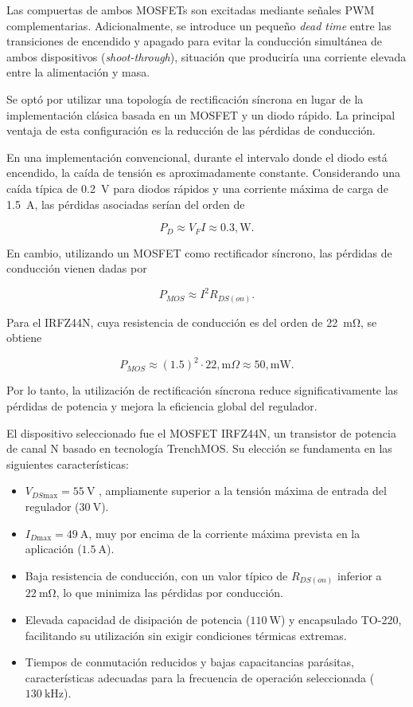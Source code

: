 \documentclass[a4paper,12pt]{article}
\begin{document}
Las compuertas de ambos MOSFETs son excitadas mediante señales PWM complementarias. Adicionalmente, se introduce un pequeño \textit{dead time} entre las transiciones de encendido y apagado para evitar la conducción simultánea de ambos dispositivos (\textit{shoot-through}), situación que produciría una corriente elevada entre la alimentación y masa.

Se optó por utilizar una topología de rectificación síncrona en lugar de la implementación clásica basada en un MOSFET y un diodo rápido. La principal ventaja de esta configuración es la reducción de las pérdidas de conducción.

En una implementación convencional, durante el intervalo donde el diodo está encendido, la caída de tensión es aproximadamente constante. Considerando una caída típica de \SI{0.2}{\volt} para diodos rápidos y una corriente máxima de carga de \SI{1.5}{\ampere}, las pérdidas asociadas serían del orden de

\[
P_D \approx V_F I \approx 0.3,\text{W}.
\]

En cambio, utilizando un MOSFET como rectificador síncrono, las pérdidas de conducción vienen dadas por

\[
P_{MOS} \approx I^2 R_{DS(on)}.
\]

Para el IRFZ44N, cuya resistencia de conducción es del orden de \SI{22}{\milli\ohm}, se obtiene

\[
P_{MOS} \approx (1.5)^2 \cdot 22,\text{m}\Omega
\approx 50,\text{mW}.
\]

Por lo tanto, la utilización de rectificación síncrona reduce significativamente las pérdidas de potencia y mejora la eficiencia global del regulador.

El dispositivo seleccionado fue el MOSFET IRFZ44N, un transistor de potencia de canal N basado en tecnología TrenchMOS. Su elección se fundamenta en las siguientes características:

\begin{itemize}
\item $V_{DS\text{max}}=\SI{55}{\volt}$ , ampliamente superior a la tensión máxima de entrada del regulador ($\SI{30}{\volt}$).

\item $I_{D\text{max}} = \SI{49}{\ampere}$, muy por encima de la corriente máxima prevista en la aplicación ($\SI{1.5}{\ampere}$).

\item Baja resistencia de conducción, con un valor típico de \(R_{DS(on)}\) inferior a $\SI{22}{\milli\ohm}$, lo que minimiza las pérdidas por conducción.

\item Elevada capacidad de disipación de potencia ($\SI{110}{\watt}$) y encapsulado TO-220, facilitando su utilización sin exigir condiciones térmicas extremas.

\item Tiempos de conmutación reducidos y bajas capacitancias parásitas, características adecuadas para la frecuencia de operación seleccionada ($\SI{130}{\kilo\hertz}$).

\end{itemize}
\end{document}
